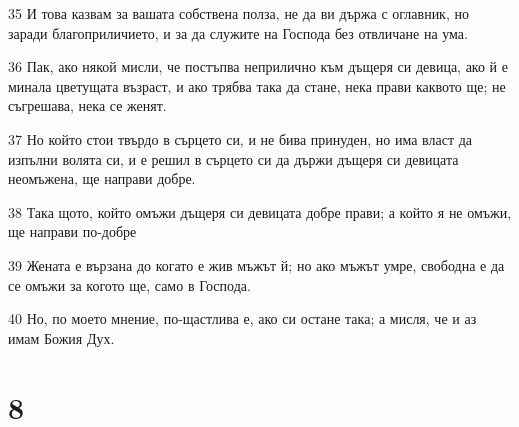 \par 35 И това казвам за вашата собствена полза, не да ви държа с оглавник, но заради благоприличието, и за да служите на Господа без отвличане на ума.
\par 36 Пак, ако някой мисли, че постъпва неприлично към дъщеря си девица, ако й е минала цветущата възраст, и ако трябва така да стане, нека прави каквото ще; не съгрешава, нека се женят.
\par 37 Но който стои твърдо в сърцето си, и не бива принуден, но има власт да изпълни волята си, и е решил в сърцето си да държи дъщеря си девицата неомъжена, ще направи добре.
\par 38 Така щото, който омъжи дъщеря си девицата добре прави; а който я не омъжи, ще направи по-добре
\par 39 Жената е вързана до когато е жив мъжът й; но ако мъжът умре, свободна е да се омъжи за когото ще, само в Господа.
\par 40 Но, по моето мнение, по-щастлива е, ако си остане така; а мисля, че и аз имам Божия Дух.

\chapter{8}

